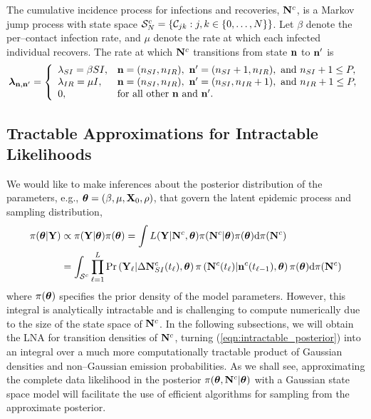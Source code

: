 The cumulative incidence process for infections and recoveries, $ \mathbf{N}^c $, is a Markov jump process with state space $ \mathcal{S}_N^c = \left \lbrace \mathcal{C}_{jk}:j,k\in\lbrace0,\dots,N\rbrace\right \rbrace $. Let $ \beta $ denote the per--contact infection rate, and $ \mu $ denote the rate at which each infected individual recovers. The rate at which $ \mathbf{N}^c $ transitions from state $ \mathbf{n} $ to $ \mathbf{n}^{\prime}$ is 
\begin{equation}
	\label{eqn:lna_sir_rates}
	\boldsymbol{\lambda}_{\mathbf{n},\mathbf{n}^\prime} = \left \lbrace \begin{array}{ll}
	\lambda_{SI} = \beta S I, & \mathbf{n} = (n_{SI},n_{IR}),\ \mathbf{n}^\prime = (n_{SI}+1,n_{IR}),\text{ and } n_{SI}+1\leq P, \\
	 \lambda_{IR} = \mu I, &  \mathbf{n} = (n_{SI},n_{IR}),\  \mathbf{n}^\prime = (n_{SI},n_{IR}+1),\text{ and } n_{IR}+1\leq P, \\
	 0, & \text{for all other } \mathbf{n} \text{ and } \mathbf{n}^\prime.
	\end{array} \right.
\end{equation}

\subsection{Tractable Approximations for Intractable Likelihoods}
\label{subsec:lna_motivation}
We would like to make inferences about the posterior distribution of the parameters, e.g., $ \boldsymbol{\theta} = (\beta, \mu, \mathbf{X}_0, \rho)$, that govern the latent epidemic process and sampling distribution, 
\begin{align}
\label{eqn:intractable_posterior}
 \pi(\boldsymbol{\theta}|\mathbf{Y})&\propto \pi(\mathbf{Y}|\boldsymbol{\theta})\pi(\boldsymbol{\theta}) = \int L(\mathbf{Y}|\mathbf{N}^c,\boldsymbol{\theta})\pi(\mathbf{N}^c|\boldsymbol{\theta})\pi(\boldsymbol{\theta})\mathrm{d}\pi(\mathbf{N}^c)\nonumber\\
 &= \int_{\mathcal{S}^c}\prod_{\ell=1}^L \Pr\left (\mathbf{Y}_\ell|\Delta\mathbf{N}_{SI}^c(t_\ell),\boldsymbol{\theta}\right )\pi\left (\mathbf{N}^c(t_\ell)|\mathbf{n}^c(t_{\ell-1}),\boldsymbol{\theta}\right )\pi(\boldsymbol{\theta})\mathrm{d}\pi(\mathbf{N}^c)
\end{align}
where $ \pi(\boldsymbol{\theta}) $ specifies the prior density of the model parameters. However, this integral is analytically intractable and is challenging to compute numerically due to the size of the state space of $ \mathbf{N}^c $. In the following subsections, we will obtain the LNA for transition densities of $ \mathbf{N}^c $, turning (\ref{eqn:intractable_posterior}) into an integral over a much more computationally tractable product of Gaussian densities and non--Gaussian emission probabilities. As we shall see, approximating the complete data likelihood in the posterior $ \pi(\boldsymbol{\theta},\mathbf{N}^c|\boldsymbol{\theta}) $ with a Gaussian state space model will facilitate the use of efficient algorithms for sampling from the approximate posterior. 


